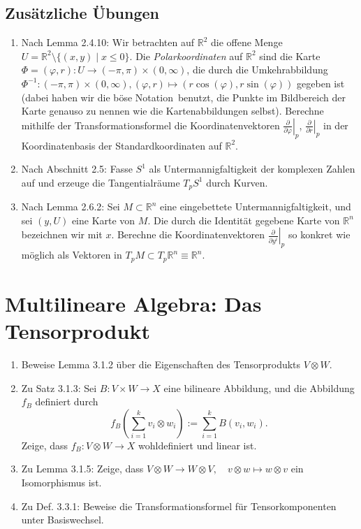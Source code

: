 \documentclass[a4paper]{scrartcl}
\newcommand{\R}{\mathbb{R}}
\begin{document}
	\subsection{Zusätzliche Übungen}
	\begin{enumerate}
		\item Nach Lemma 2.4.10:
			Wir betrachten auf $\R^2$ die offene Menge $U = \R^2 \setminus\{(x,y) \mid x \le 0\}$. Die \emph{Polarkoordinaten} auf $\R^2$ sind die Karte $\Phi = (\varphi,r) \colon U \to (-\pi,\pi) \times (0,\infty)$, die durch die Umkehrabbildung $\Phi^{-1}\colon (-\pi,\pi)\times(0,\infty), (\varphi,r) \mapsto (r\cos(\varphi), r\sin(\varphi))$ gegeben ist (dabei haben wir die \glqq böse Notation\grqq\ benutzt, die Punkte im Bildbereich der Karte genauso zu nennen wie die Kartenabbildungen selbst). Berechne mithilfe der Transformationsformel die Koordinatenvektoren $\left.\frac{\partial}{\partial\varphi}\right|_p$, $\left.\frac{\partial}{\partial r}\right|_p$ in der Koordinatenbasis der Standardkoordinaten auf $\R^2$.
		\item Nach Abschnitt 2.5:
			Fasse $S^1$ als Untermannigfaltigkeit der komplexen Zahlen auf und erzeuge die Tangentialräume $T_pS^1$ durch Kurven.
		\item Nach Lemma 2.6.2:
			Sei $M \subset \R^n$ eine eingebettete Untermannigfaltigkeit, und sei $(y,U)$ eine Karte von $M$. Die durch die Identität gegebene Karte von $\R^n$ bezeichnen wir mit $x$. Berechne die Koordinatenvektoren $\left.\frac{\partial}{\partial y^i}\right|_p$ so konkret wie möglich als Vektoren in $T_pM \subset T_p\R^n \equiv \R^n$.
	\end{enumerate}

	\section{Multilineare Algebra: Das Tensorprodukt}
	\begin{enumerate}
		\item Beweise Lemma 3.1.2 über die Eigenschaften des Tensorprodukts $V\otimes W$.
		\item Zu Satz 3.1.3: Sei $B\colon V\times W \to X$ eine bilineare Abbildung, und die Abbildung $f_B$ definiert durch 
			\[f_B\left(\sum_{i=1}^k v_i \otimes w_i\right) := \sum_{i=1}^k B(v_i,w_i).\]
			Zeige, dass $f_B\colon V\otimes W\rightarrow X$ wohldefiniert und linear ist.
		\item Zu Lemma 3.1.5: Zeige, dass $V\otimes W\rightarrow W\otimes V,\quad v\otimes w \mapsto w\otimes v$ ein Isomorphismus ist.
		\item Zu Def. 3.3.1: Beweise die Transformationsformel für Tensorkomponenten unter Basiswechsel.
	\end{enumerate}
\end{document}
